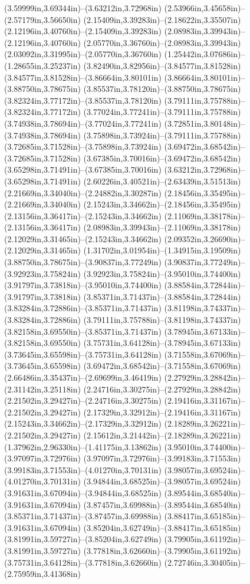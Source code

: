 (3.59999in,3.69344in)--(3.63212in,3.72968in) (2.53966in,3.45658in)--(2.57179in,3.56650in) (2.15409in,3.39283in)--(2.18622in,3.35507in) (2.12196in,3.40760in)--(2.15409in,3.39283in) (2.08983in,3.39943in)--(2.12196in,3.40760in) (2.05770in,3.36760in)--(2.08983in,3.39943in) (2.03092in,3.31995in)--(2.05770in,3.36760in) (1.25442in,3.07686in)--(1.28655in,3.25237in) (3.82490in,3.82956in)--(3.84577in,3.81528in) (3.84577in,3.81528in)--(3.86664in,3.80101in) (3.86664in,3.80101in)--(3.88750in,3.78675in) (3.85537in,3.78120in)--(3.88750in,3.78675in) (3.82324in,3.77172in)--(3.85537in,3.78120in) (3.79111in,3.75788in)--(3.82324in,3.77172in) (3.77024in,3.77241in)--(3.79111in,3.75788in) (3.74938in,3.78694in)--(3.77024in,3.77241in) (3.72851in,3.80148in)--(3.74938in,3.78694in) (3.75898in,3.73924in)--(3.79111in,3.75788in) (3.72685in,3.71528in)--(3.75898in,3.73924in) (3.69472in,3.68542in)--(3.72685in,3.71528in) (3.67385in,3.70016in)--(3.69472in,3.68542in) (3.65298in,3.71491in)--(3.67385in,3.70016in) (3.63212in,3.72968in)--(3.65298in,3.71491in) (2.60226in,3.40521in)--(2.63439in,3.51513in) (2.21669in,3.34040in)--(2.24882in,3.30287in) (2.18456in,3.35495in)--(2.21669in,3.34040in) (2.15243in,3.34662in)--(2.18456in,3.35495in) (2.13156in,3.36417in)--(2.15243in,3.34662in) (2.11069in,3.38178in)--(2.13156in,3.36417in) (2.08983in,3.39943in)--(2.11069in,3.38178in) (2.12029in,3.31465in)--(2.15243in,3.34662in) (2.09352in,3.26690in)--(2.12029in,3.31465in) (1.31702in,3.01954in)--(1.34915in,3.19509in) (3.88750in,3.78675in)--(3.90837in,3.77249in) (3.90837in,3.77249in)--(3.92923in,3.75824in) (3.92923in,3.75824in)--(3.95010in,3.74400in) (3.91797in,3.73818in)--(3.95010in,3.74400in) (3.88584in,3.72844in)--(3.91797in,3.73818in) (3.85371in,3.71437in)--(3.88584in,3.72844in) (3.83284in,3.72886in)--(3.85371in,3.71437in) (3.81198in,3.74337in)--(3.83284in,3.72886in) (3.79111in,3.75788in)--(3.81198in,3.74337in) (3.82158in,3.69550in)--(3.85371in,3.71437in) (3.78945in,3.67133in)--(3.82158in,3.69550in) (3.75731in,3.64128in)--(3.78945in,3.67133in) (3.73645in,3.65598in)--(3.75731in,3.64128in) (3.71558in,3.67069in)--(3.73645in,3.65598in) (3.69472in,3.68542in)--(3.71558in,3.67069in) (2.66486in,3.35437in)--(2.69699in,3.46419in) (2.27929in,3.28842in)--(2.31142in,3.25118in) (2.24716in,3.30275in)--(2.27929in,3.28842in) (2.21502in,3.29427in)--(2.24716in,3.30275in) (2.19416in,3.31167in)--(2.21502in,3.29427in) (2.17329in,3.32912in)--(2.19416in,3.31167in) (2.15243in,3.34662in)--(2.17329in,3.32912in) (2.18289in,3.26221in)--(2.21502in,3.29427in) (2.15612in,3.21442in)--(2.18289in,3.26221in) (1.37962in,2.96330in)--(1.41175in,3.13862in) (3.95010in,3.74400in)--(3.97097in,3.72976in) (3.97097in,3.72976in)--(3.99183in,3.71553in) (3.99183in,3.71553in)--(4.01270in,3.70131in) (3.98057in,3.69524in)--(4.01270in,3.70131in) (3.94844in,3.68525in)--(3.98057in,3.69524in) (3.91631in,3.67094in)--(3.94844in,3.68525in) (3.89544in,3.68540in)--(3.91631in,3.67094in) (3.87457in,3.69988in)--(3.89544in,3.68540in) (3.85371in,3.71437in)--(3.87457in,3.69988in) (3.88417in,3.65185in)--(3.91631in,3.67094in) (3.85204in,3.62749in)--(3.88417in,3.65185in) (3.81991in,3.59727in)--(3.85204in,3.62749in) (3.79905in,3.61192in)--(3.81991in,3.59727in) (3.77818in,3.62660in)--(3.79905in,3.61192in) (3.75731in,3.64128in)--(3.77818in,3.62660in) (2.72746in,3.30405in)--(2.75959in,3.41368in) 